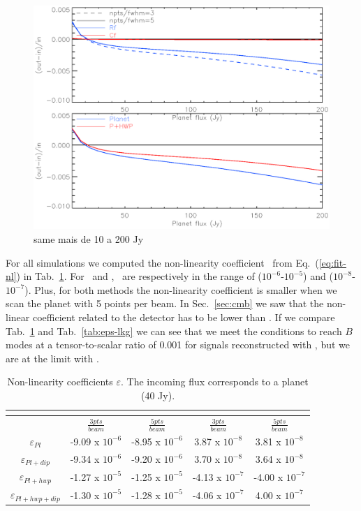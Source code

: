 \begin{figure}[h]
  \includegraphics[clip, angle=0, width=\columnwidth]{Figures/diff-rf-cf-10-200jy-2.eps}
  \caption{same mais de 10 a 200 Jy}
  \label{fig:diff-rf-cf}
\end{figure}


For all simulations we computed the non-linearity coefficient \epsDET\ from Eq.~(\ref{eq:fit-nl}) in Tab.~\ref{tab:eps}. For \rf\ and \cf , \epsDET\ are respectively in the range of ($10^{-6}$-$10^{-5}$) and ($10^{-8}$-$10^{-7}$). Plus, for both methods the non-linearity coefficient is smaller when we scan the planet with 5 points per beam. In Sec.~\ref{sec:cmb} we saw that the non-linear coefficient related to the detector \epsDET has to be lower than \epsCMB. If we compare Tab.~\ref{tab:eps} and Tab.~\ref{tab:eps-lkg} we can see that we meet the conditions to reach $B$ modes at a tensor-to-scalar ratio of 0.001 for signals reconstructed with \cf , but we are at the limit with \rf .\\

\begin{table}
\tiny
\begin{tabular}{|c|c|c|c|c|}
	\hline
	    & \multicolumn{2}{|c|}{\rf} & \multicolumn{2}{|c|}{\cf} \\
	\hline
	    & $\frac{3pts}{beam}$ & $\frac{5pts}{beam}$ & $\frac{3pts}{beam}$ & $\frac{5pts}{beam}$ \\
	    \hline
	    $\varepsilon_{Pl}$ & -9.09 x $10^{-6}$ & -8.95 x $10^{-6}$ & 3.87 x $10^{-8}$ & 3.81 x $10^{-8}$ \\ 
	    \hline
	    $\varepsilon_{Pl+dip}$ & -9.34 x $10^{-6}$ & -9.20 x $10^{-6}$ & 3.70 x $10^{-8}$ & 3.64 x $10^{-8}$ \\
	    \hline
	    $\varepsilon_{Pl+hwp}$ & -1.27 x $10^{-5}$ & -1.25 x $10^{-5}$ & -4.13 x $10^{-7}$ & -4.00 x $10^{-7}$ \\
	\hline
	$\varepsilon_{Pl+hwp+dip}$ & -1.30 x $10^{-5}$ & -1.28 x $10^{-5}$ & -4.06 x $10^{-7}$ & 4.00 x $10^{-7}$ \\
	\hline
\end{tabular}
\caption{Non-linearity coefficients $\varepsilon$. The incoming flux corresponds to a planet (40 Jy).}
\label{tab:eps}
\end{table}


